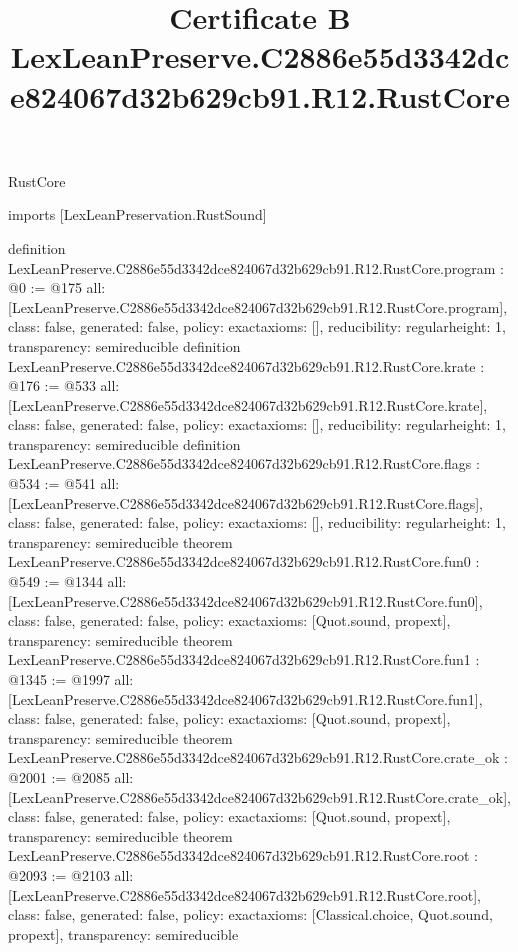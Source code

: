 \begin{lexlean}{RustCore}
\title{Certificate B LexLeanPreserve.C2886e55d3342dce824067d32b629cb91.R12.RustCore}
\begin{coremodule}
imports [LexLeanPreservation.RustSound]

definition LexLeanPreserve.C2886e55d3342dce824067d32b629cb91.R12.RustCore.program : @0 := @175 {
  all: [LexLeanPreserve.C2886e55d3342dce824067d32b629cb91.R12.RustCore.program],
  class: false,
  generated: false,
  policy: exact{axioms: []},
  reducibility: regular{height: 1},
  transparency: semireducible
}
definition LexLeanPreserve.C2886e55d3342dce824067d32b629cb91.R12.RustCore.krate : @176 := @533 {
  all: [LexLeanPreserve.C2886e55d3342dce824067d32b629cb91.R12.RustCore.krate],
  class: false,
  generated: false,
  policy: exact{axioms: []},
  reducibility: regular{height: 1},
  transparency: semireducible
}
definition LexLeanPreserve.C2886e55d3342dce824067d32b629cb91.R12.RustCore.flags : @534 := @541 {
  all: [LexLeanPreserve.C2886e55d3342dce824067d32b629cb91.R12.RustCore.flags],
  class: false,
  generated: false,
  policy: exact{axioms: []},
  reducibility: regular{height: 1},
  transparency: semireducible
}
theorem LexLeanPreserve.C2886e55d3342dce824067d32b629cb91.R12.RustCore.fun0 : @549 := @1344 {
  all: [LexLeanPreserve.C2886e55d3342dce824067d32b629cb91.R12.RustCore.fun0],
  class: false,
  generated: false,
  policy: exact{axioms: [Quot.sound, propext]},
  transparency: semireducible
}
theorem LexLeanPreserve.C2886e55d3342dce824067d32b629cb91.R12.RustCore.fun1 : @1345 := @1997 {
  all: [LexLeanPreserve.C2886e55d3342dce824067d32b629cb91.R12.RustCore.fun1],
  class: false,
  generated: false,
  policy: exact{axioms: [Quot.sound, propext]},
  transparency: semireducible
}
theorem LexLeanPreserve.C2886e55d3342dce824067d32b629cb91.R12.RustCore.crate_ok : @2001 := @2085 {
  all: [LexLeanPreserve.C2886e55d3342dce824067d32b629cb91.R12.RustCore.crate_ok],
  class: false,
  generated: false,
  policy: exact{axioms: [Quot.sound, propext]},
  transparency: semireducible
}
theorem LexLeanPreserve.C2886e55d3342dce824067d32b629cb91.R12.RustCore.root : @2093 := @2103 {
  all: [LexLeanPreserve.C2886e55d3342dce824067d32b629cb91.R12.RustCore.root],
  class: false,
  generated: false,
  policy: exact{axioms: [Classical.choice, Quot.sound, propext]},
  transparency: semireducible
}


\end{coremodule}
\end{lexlean}
